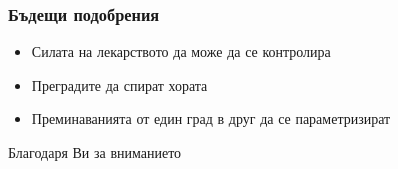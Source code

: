 \documentclass[14pt]{beamer}
\begin{document}
\begin{frame}
\frametitle{Бъдещи подобрения}
\begin{itemize}
    \item {Силата на лекарството да може да се контролира}
    \item {Преградите да спират хората}
    \item {Преминаванията от един град в друг да се параметризират}
\end{itemize}
\end{frame}

\begin{frame}
\begin{center}
Благодаря Ви за вниманието
\end{center}
\end{frame}
\end{document}
